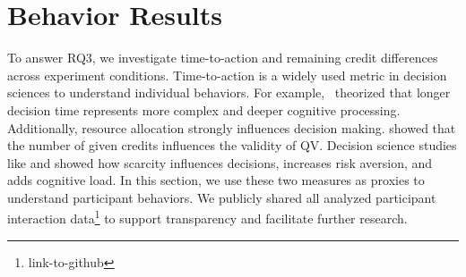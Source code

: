 \section{Behavior Results}
\label{sec:behave_result}
To answer RQ3, we investigate time-to-action and remaining credit differences across experiment conditions. Time-to-action is a widely used metric in decision sciences to understand individual behaviors. For example,~\textcite{payneAdaptiveDecisionMaker1993} theorized that longer decision time represents more complex and deeper cognitive processing. Additionally, resource allocation strongly influences decision making. \textcite{chengCanShowWhat2021} showed that the number of given credits influences the validity of QV. Decision science studies like \textcite{Shah2015a} and \cite{debruijnPovertyEconomicDecision2022} showed how scarcity influences decisions, increases risk aversion, and adds cognitive load. In this section, we use these two measures as proxies to understand participant behaviors. We publicly shared all analyzed participant interaction data\footnote{link-to-github} to support transparency and facilitate further research.

\newsavebox{\savefig}

